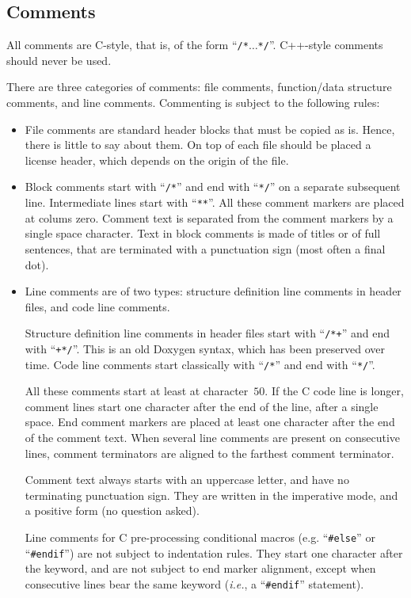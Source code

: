 \subsection{Comments}

All comments are C-style, that is, of the form
``\texttt{/*}$\ldots$\texttt{*/}''. C++-style comments should never be
used.

There are three categories of comments: file comments, function/data
structure comments, and line comments. Commenting is subject to the
following rules:
\begin{itemize}
\item
  File comments are standard header blocks that must be copied as
  is. Hence, there is little to say about them. On top of each file
  should be placed a license header, which depends on the origin of
  the file.
\item
  Block comments start with ``\texttt{/*}'' and end with
  ``\texttt{*/}'' on a separate subsequent line. Intermediate lines
  start with ``\texttt{**}''. All these comment markers are placed at
  colums zero. Comment text is separated from the comment markers by a
  single space character. Text in block comments is made of titles or
  of full sentences, that are terminated with a punctuation sign (most
  often a final dot).
\item
  Line comments are of two types: structure definition line comments
  in header files, and code line comments.

  Structure definition line comments in header files start with
  ``\texttt{/*+}'' and end with ``\texttt{+*/}''. This is an old
  Doxygen syntax, which has been preserved over time. Code line
  comments start classically with ``\texttt{/*}'' and end with
  ``\texttt{*/}''.

  All these comments start at least at character~$50$. If the C code
  line is longer, comment lines start one character after the end of
  the line, after a single space. End comment markers are placed at
  least one character after the end of the comment text. When several
  line comments are present on consecutive lines, comment terminators
  are aligned to the farthest comment terminator.

  Comment text always starts with an uppercase letter, and have no
  terminating punctuation sign. They are written in the imperative
  mode, and a positive form (no question asked).

  Line comments for C pre-processing conditional macros
  (e.g. ``\texttt{\#else}'' or ``\texttt{\#endif}'') are not subject
  to indentation rules. They start one character after the keyword,
  and are not subject to end marker alignment, except when consecutive
  lines bear the same keyword (\textit{i.e.}, a ``\texttt{\#endif}''
  statement).
\end{itemize}

